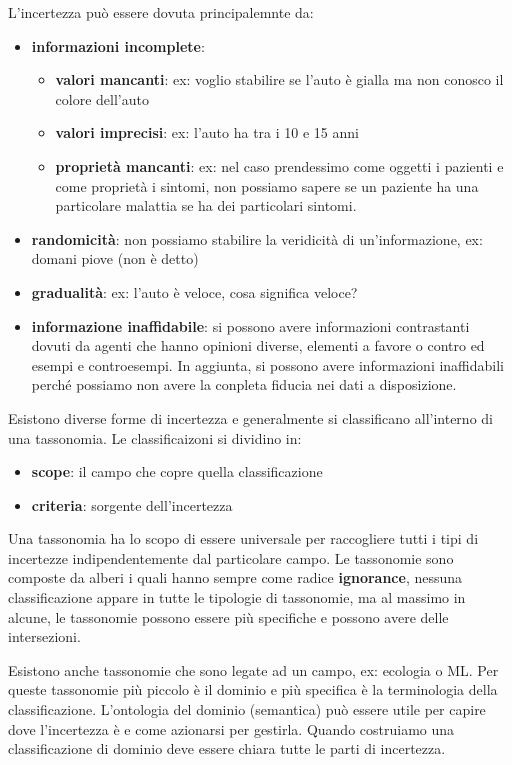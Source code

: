 L'incertezza può essere dovuta principalemnte da:
\begin{itemize}
    \item \textbf{informazioni incomplete}:
    \begin{itemize}
        \item \textbf{valori mancanti}: ex: voglio stabilire se l'auto è gialla ma
        non conosco il colore dell'auto
        \item \textbf{valori imprecisi}: ex: l'auto ha tra i 10 e 15 anni
        \item \textbf{proprietà mancanti}: ex: nel caso prendessimo come oggetti i
        pazienti e come proprietà i sintomi, non possiamo sapere se un paziente 
        ha una particolare malattia se ha dei particolari sintomi.
    \end{itemize}
    \item \textbf{randomicità}: non possiamo stabilire la 
    veridicità di un'informazione, ex: domani piove (non è detto)
    \item \textbf{gradualità}: ex: l'auto è veloce, cosa significa veloce?
    \item \textbf{informazione inaffidabile}: si possono avere informazioni
    contrastanti dovuti da agenti che hanno opinioni diverse, elementi a favore
    o contro ed esempi e controesempi. In aggiunta, si possono avere informazioni
    inaffidabili perché possiamo non avere la conpleta fiducia nei dati a disposizione.
\end{itemize}

Esistono diverse forme di incertezza e generalmente si classificano all'interno
di una tassonomia. Le classificaizoni si dividino in:
\begin{itemize}
    \item \textbf{scope}: il campo che copre quella classificazione
    \item \textbf{criteria}: sorgente dell'incertezza
\end{itemize}

Una tassonomia ha lo scopo di essere universale per raccogliere tutti i tipi di
incertezze indipendentemente dal particolare campo. Le tassonomie sono composte
da alberi i quali hanno sempre come radice \textbf{ignorance}, nessuna classificazione
appare in tutte le tipologie di tassonomie, ma al massimo in alcune, le tassonomie
possono essere più specifiche e possono avere delle intersezioni.

Esistono anche tassonomie che sono legate ad un campo, ex: ecologia o ML. Per
queste tassonomie più piccolo è il dominio e più specifica è la terminologia della
classificazione. L'ontologia del dominio (semantica) può essere utile per capire dove l'incertezza
è e come azionarsi per gestirla. Quando costruiamo una classificazione di dominio
deve essere chiara tutte le parti di incertezza.

